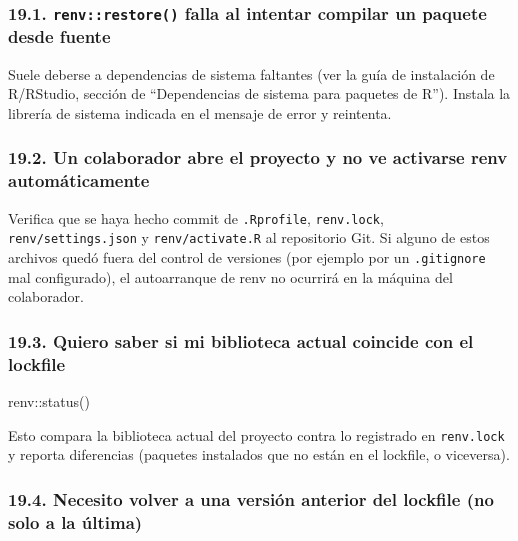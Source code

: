 \documentclass[
  man,
  floatsintext,
  longtable,
  a4paper,
  nolmodern,
  notxfonts,
  notimes,
  12pt,
  colorlinks=true,linkcolor=blue,citecolor=blue,urlcolor=blue]{apa7}
\newenvironment{Shaded}{\begin{snugshade}}{\end{snugshade}}
\newcommand{\FunctionTok}[1]{\textcolor[rgb]{0.28,0.35,0.67}{#1}}
\newcommand{\NormalTok}[1]{\textcolor[rgb]{0.00,0.23,0.31}{#1}}
\newcommand{\SpecialCharTok}[1]{\textcolor[rgb]{0.37,0.37,0.37}{#1}}
\begin{document}
\subsubsection{\texorpdfstring{19.1. \texttt{renv::restore()} falla al
intentar compilar un paquete desde
fuente}{19.1. renv::restore() falla al intentar compilar un paquete desde fuente}}\label{renvrestore-falla-al-intentar-compilar-un-paquete-desde-fuente}

Suele deberse a dependencias de sistema faltantes (ver la guía de
instalación de R/RStudio, sección de ``Dependencias de sistema para
paquetes de R''). Instala la librería de sistema indicada en el mensaje
de error y reintenta.

\subsubsection{19.2. Un colaborador abre el proyecto y no ve activarse
renv
automáticamente}\label{un-colaborador-abre-el-proyecto-y-no-ve-activarse-renv-automuxe1ticamente}

Verifica que se haya hecho commit de \texttt{.Rprofile},
\texttt{renv.lock}, \texttt{renv/settings.json} y
\texttt{renv/activate.R} al repositorio Git. Si alguno de estos archivos
quedó fuera del control de versiones (por ejemplo por un
\texttt{.gitignore} mal configurado), el autoarranque de renv no
ocurrirá en la máquina del colaborador.

\subsubsection{19.3. Quiero saber si mi biblioteca actual coincide con
el
lockfile}\label{quiero-saber-si-mi-biblioteca-actual-coincide-con-el-lockfile}

\begin{Shaded}
\begin{Highlighting}[]
\NormalTok{renv}\SpecialCharTok{::}\FunctionTok{status}\NormalTok{()}
\end{Highlighting}
\end{Shaded}

Esto compara la biblioteca actual del proyecto contra lo registrado en
\texttt{renv.lock} y reporta diferencias (paquetes instalados que no
están en el lockfile, o viceversa).

\subsubsection{19.4. Necesito volver a una versión anterior del lockfile
(no solo a la
última)}\label{necesito-volver-a-una-versiuxf3n-anterior-del-lockfile-no-solo-a-la-uxfaltima}
\end{document}
